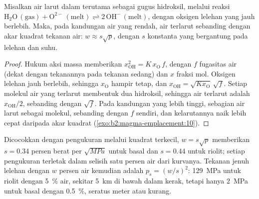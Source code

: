 \begin{proposition}\label{prop:b2:magma-emplacement:sqrt}
Misalkan air larut dalam  terutama sebagai gugus hidroksil, melalui
reaksi $\mathrm{H_2O\,(gas)} + \mathrm{O^{2-}\,(melt)} \rightleftharpoons
2\,\mathrm{OH^-\,(melt)}$, dengan oksigen lelehan yang jauh berlebih. Maka, pada
kandungan air yang rendah, air terlarut sebanding dengan akar kuadrat
tekanan air: $w \approx s\sqrt{p}$, dengan $s$ konstanta yang bergantung pada lelehan dan
suhu.
\end{proposition}

\begin{proof}
Hukum aksi massa memberikan $x_{\mathrm{OH}}^2 = K\,x_{\mathrm{O}}\,f$, dengan $f$
fugasitas air (dekat dengan tekanannya pada tekanan sedang) dan $x$
fraksi mol. Oksigen lelehan jauh berlebih, sehingga
$x_{\mathrm{O}}$ hampir tetap, dan $x_{\mathrm{OH}} = \sqrt{Kx_{\mathrm{O}}}\,
\sqrt f$. Setiap molekul air yang terlarut membentuk dua hidroksil, sehingga air
terlarut adalah $x_{\mathrm{OH}}/2$, sebanding dengan $\sqrt f$. Pada kandungan yang lebih tinggi, sebagian
air larut sebagai molekul, sebanding dengan $f$ sendiri, dan
kelarutannya naik lebih cepat daripada akar kuadrat (\cref{exo:b2:magma-emplacement:10}).
\end{proof}

Dicocokkan dengan pengukuran melalui kuadrat terkecil, $w = s\sqrt p$ memberikan
$s = 0.34$ persen berat per $\sqrt{\unit{MPa}}$ untuk basal dan
$s = 0.44$ untuk riolit; setiap pengukuran terletak dalam selisih satu persen
air dari kurvanya. Tekanan jenuh lelehan dengan $w$ persen
air kemudian adalah $p_s = (w/s)^2$: \qty{129}{MPa} untuk riolit dengan
\qty{5}{\percent} air, sekitar \qty{5}{km} di bawah dalam kerak, tetapi hanya
\qty{2}{MPa} untuk basal dengan \qty{0.5}{\percent}, seratus meter atau kurang.

